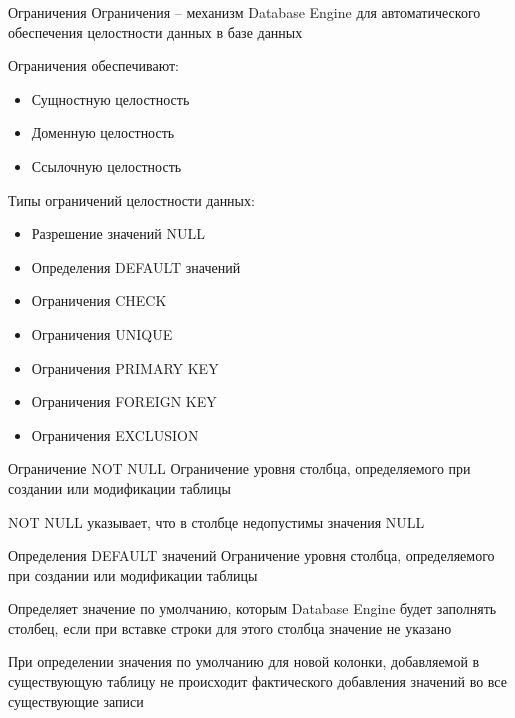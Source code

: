 \documentclass[12pt]{article}
\begin{document}
\begin{defin}{Ограничения}
    Ограничения -- механизм Database Engine для автоматического обеспечения целостности данных в базе данных 

    Ограничения обеспечивают:

    \begin{itemize}
        \item Сущностную целостность 
        \item Доменную целостность 
        \item Ссылочную целостность 
    \end{itemize}

    Типы ограничений целостности данных:

    \begin{itemize}
        \item Разрешение значений NULL 
        \item Определения DEFAULT значений 
        \item Ограничения CHECK 
        \item Ограничения UNIQUE
        \item Ограничения PRIMARY KEY
        \item Ограничения FOREIGN KEY
        \item Ограничения EXCLUSION
    \end{itemize}
\end{defin}

\begin{nota}{Ограничение NOT NULL}
    Ограничение уровня столбца, определяемого при создании или модификации таблицы 

    NOT NULL указывает, что в столбце недопустимы значения NULL 
\end{nota}

\begin{nota}{Определения DEFAULT значений}
    Ограничение уровня столбца, определяемого при создании или модификации таблицы 

    Определяет значение по умолчанию, которым Database Engine будет заполнять столбец, если при вставке строки для этого столбца значение не указано 

    При определении значения по умолчанию для новой колонки, добавляемой в существующую таблицу не происходит фактического добавления значений во все существующие записи 
\end{nota}
\end{document}
